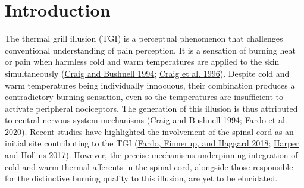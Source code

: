 \documentclass[
]{article}
\begin{document}
\newpage

\hypertarget{introduction}{%
\section{Introduction}\label{introduction}}

The thermal grill illusion (TGI) is a perceptual phenomenon that
challenges conventional understanding of pain perception. It is a
sensation of burning heat or pain when harmless cold and warm
temperatures are applied to the skin simultaneously
(\protect\hyperlink{ref-craig_thermal_1994}{Craig and Bushnell 1994};
\protect\hyperlink{ref-craig_functional_1996}{Craig et al. 1996}).
Despite cold and warm temperatures being individually innocuous, their
combination produces a contradictory burning sensation, even so the
temperatures are insufficient to activate peripheral nociceptors. The
generation of this illusion is thus attributed to central nervous system
mechanisms (\protect\hyperlink{ref-craig_thermal_1994}{Craig and
Bushnell 1994}; \protect\hyperlink{ref-fardo_beyond_2020}{Fardo et al.
2020}). Recent studies have highlighted the involvement of the spinal
cord as an initial site contributing to the TGI
(\protect\hyperlink{ref-fardo_organization_2018}{Fardo, Finnerup, and
Haggard 2018}; \protect\hyperlink{ref-harper_conditioned_2017}{Harper
and Hollins 2017}). However, the precise mechanisms underpinning
integration of cold and warm thermal afferents in the spinal cord,
alongside those responsible for the distinctive burning quality to this
illusion, are yet to be elucidated.
\end{document}
